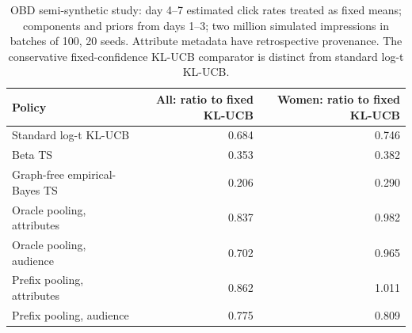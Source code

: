 \begin{table}[!htbp]\centering\small
\begin{lrbox}{\latestTableBox}
\begin{tabular}{lrr}
\toprule
Policy & All: ratio to fixed KL-UCB & Women: ratio to fixed KL-UCB \\
\midrule
Standard log-t KL-UCB & 0.684 & 0.746 \\
Beta TS & 0.353 & 0.382 \\
Graph-free empirical-Bayes TS & 0.206 & 0.290 \\
Oracle pooling, attributes & 0.837 & 0.982 \\
Oracle pooling, audience & 0.702 & 0.965 \\
Prefix pooling, attributes & 0.862 & 1.011 \\
Prefix pooling, audience & 0.775 & 0.809 \\
\bottomrule
\end{tabular}\end{lrbox}
\ifdim\wd\latestTableBox>\linewidth\resizebox{\linewidth}{!}{\usebox{\latestTableBox}}\else\usebox{\latestTableBox}\fi
\caption{OBD semi-synthetic study: day 4--7 estimated click rates treated as fixed means; components and priors from days 1--3; two million simulated impressions in batches of 100, 20 seeds. Attribute metadata have retrospective provenance. The conservative fixed-confidence KL-UCB comparator is distinct from standard log-t KL-UCB.}
\label{tab:latest-obd}
\end{table}
